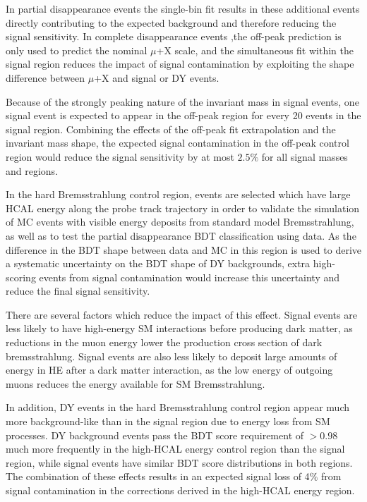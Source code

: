 In partial disappearance events the single-bin fit results in these additional events directly contributing to the expected background and therefore reducing the signal sensitivity. 
In complete disappearance events ,the off-peak prediction is only used to predict the nominal $\mu$+X scale, and the simultaneous fit within the signal region reduces the impact of signal contamination by exploiting the shape difference between $\mu$+X and signal or DY events.

Because of the strongly peaking nature of the invariant mass in signal events, one signal event is expected to appear in the off-peak region for every 20 events in the signal region.
Combining the effects of the off-peak fit extrapolation and the invariant mass shape, the expected signal contamination in the off-peak control region would reduce the signal sensitivity by at most $2.5\%$ for all signal masses and regions.

In the hard Bremsstrahlung control region, events are selected which have large HCAL energy along the probe track trajectory in order to validate the simulation of MC events with visible energy deposits from standard model Bremsstrahlung, as well as to test the partial disappearance BDT classification using data. 
As the difference in the BDT shape between data and MC in this region is used to derive a systematic uncertainty on the BDT shape of DY backgrounds, extra high-scoring events from signal contamination would increase this uncertainty and reduce the final signal sensitivity.

There are several factors which reduce the impact of this effect.
Signal events are less likely to have high-energy SM interactions before producing dark matter, as reductions in the muon energy lower the production cross section of dark bremsstrahlung.
Signal events are also less likely to deposit large amounts of energy in HE after a dark matter interaction, as the low energy of outgoing muons reduces the energy available for SM Bremsstrahlung. 

In addition, DY events in the hard Bremsstrahlung control region appear much more background-like than in the signal region due to energy loss from SM processes.
DY background events pass the BDT score requirement of $>0.98$ much more frequently in the high-HCAL energy control region than the signal region, while signal events have similar BDT score distributions in both regions. 
The combination of these effects results in an expected signal loss of 4$\%$ from signal contamination in the corrections derived in the high-HCAL energy region.

